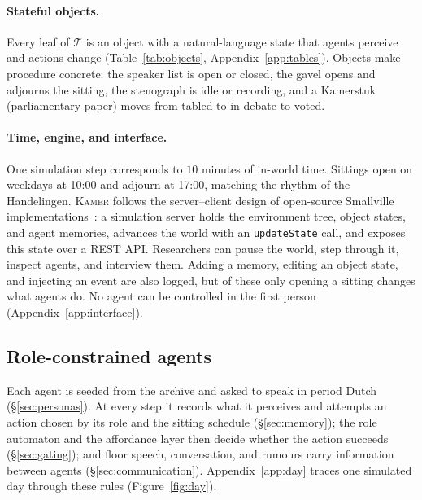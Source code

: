 \documentclass[sigconf,review,anonymous]{acmart}
\newcommand{\sys}{\textsc{Kamer}}
\begin{document}
\paragraph{Stateful objects.} Every leaf of $\mathcal{T}$ is an object with
a natural-language state that agents perceive and actions change
(Table~\ref{tab:objects}, Appendix~\ref{app:tables}). Objects make
procedure concrete: the speaker list
is open or closed, the gavel opens and adjourns the sitting, the stenograph
is idle or recording, and a Kamerstuk (parliamentary paper) moves from
tabled to in debate to voted.

\paragraph{Time, engine, and interface.} One simulation step corresponds
to $10$ minutes of in-world time.
Sittings open on weekdays at 10:00 and adjourn at 17:00, matching the
rhythm of the Handelingen. \sys{} follows the server--client design of
open-source Smallville implementations~\cite{smallvillerepo}: a simulation
server holds the environment tree, object states, and agent memories,
advances the world with an \texttt{updateState} call, and exposes this
state over a REST API. Researchers can
pause the world, step through it, inspect agents, and interview them.
Adding a memory, editing an object state, and injecting an event are also
logged, but of these only opening a sitting changes what agents do. No
agent can be controlled in the first person (Appendix~\ref{app:interface}).

\subsection{Role-constrained agents}
\label{sec:agents}

Each agent is seeded from the archive and asked to speak in period Dutch
(\S\ref{sec:personas}). At every step it records what it perceives and
attempts an action chosen by its role and the sitting schedule
(\S\ref{sec:memory}); the role automaton and the affordance layer then
decide whether the action succeeds (\S\ref{sec:gating}); and floor
speech, conversation, and rumours carry information between agents
(\S\ref{sec:communication}). Appendix~\ref{app:day} traces one simulated
day through these rules (Figure~\ref{fig:day}).
\end{document}

